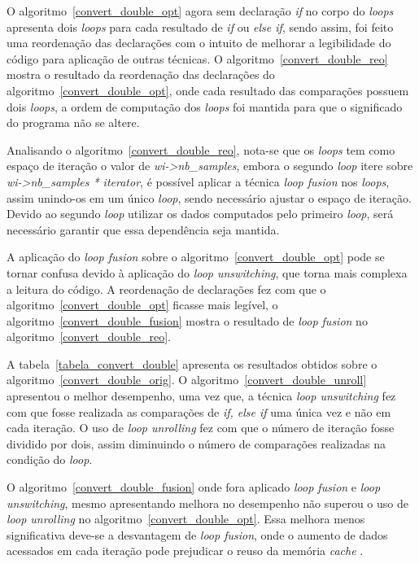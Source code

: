 O algoritmo~\ref{convert_double_opt} agora sem declaração \textit{if} no corpo
do \textit{loops} apresenta dois \textit{loops} para cada resultado de
\textit{if} ou \textit{else if}, sendo assim, foi feito uma reordenação das
declarações com o intuito de melhorar a legibilidade do código para aplicação de
outras técnicas.
O algoritmo~\ref{convert_double_reo} mostra o resultado da reordenação das
declarações do algoritmo~\ref{convert_double_opt}, onde cada resultado das
comparações possuem dois \textit{loops}, a ordem de computação dos
\textit{loops} foi mantida para que o significado do programa não se altere.

Analisando o algoritmo~\ref{convert_double_reo}, nota-se que os 
\textit{loops} tem como
espaço de iteração o valor de \textit{wi->nb\_samples}, embora o segundo
\textit{loop} itere sobre \textit{wi->nb\_samples * iterator},  é possível aplicar
a técnica \textit{loop fusion} nos \textit{loops}, assim unindo-os em um
único \textit{loop}, sendo necessário ajustar o espaço de iteração. 
Devido ao
segundo \textit{loop} utilizar os dados computados pelo primeiro \textit{loop},
será necessário garantir que essa dependência seja mantida.

A aplicação do \textit{loop fusion} sobre o
algoritmo~\ref{convert_double_opt} pode se tornar confusa devido à aplicação do
\textit{loop unswitching}, que torna mais complexa a leitura do código. 
A reordenação de declarações fez com que o algoritmo~\ref{convert_double_opt}
ficasse mais legível, o algoritmo~\ref{convert_double_fusion} mostra o 
resultado de \textit{loop fusion} no algoritmo~\ref{convert_double_reo}. 


A tabela~\ref{tabela_convert_double} apresenta os resultados obtidos sobre o
algoritmo~\ref{convert_double_orig}.
O algoritmo~\ref{convert_double_unroll} apresentou o melhor desempenho, uma vez
que, a técnica \textit{loop unswitching} fez com que fosse realizada as
comparações de \textit{if, else if} uma única vez e não em cada iteração.
O uso de \textit{loop unrolling} fez com que o número de iteração fosse dividido
por dois, assim diminuindo o número de comparações realizadas na condição do
\textit{loop}. 

O algoritmo~\ref{convert_double_fusion} onde fora aplicado \textit{loop fusion}
e \textit{loop unswitching}, mesmo apresentando melhora no desempenho não superou
o uso de \textit{loop unrolling} no algoritmo~\ref{convert_double_opt}.
Essa melhora menos significativa deve-se a desvantagem de \textit{loop
fusion}, onde o aumento de dados acessados em cada iteração pode prejudicar o
reuso da memória \textit{cache} \cite{Rivera:1999}.


